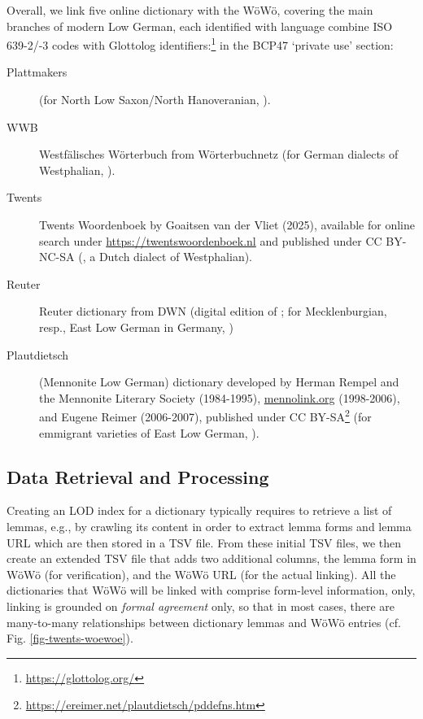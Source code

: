 Overall, we link five online dictionary with the WöWö, covering the main branches of modern Low German, each identified with language combine ISO 639-2/-3 codes with Glottolog identifiers:\footnote{\url{https://glottolog.org/}} in the BCP47 `private use' section: 

\begin{description}
\item[Plattmakers] (for North Low Saxon/North Hanoveranian, ).
\item[WWB] Westfälisches Wörterbuch from Wörterbuchnetz (for German dialects of Westphalian, ).
\item[Twents] Twents Woordenboek by Goaitsen van der Vliet (2025), available for online search under \url{https://twentswoordenboek.nl} and published under CC BY-NC-SA (, a Dutch dialect of Westphalian).
\item[Reuter] Reuter dictionary from DWN (digital edition of \cite{muller1904reuter}; for Mecklenburgian, resp., East Low German in Germany, )
\item[Plautdietsch] (Mennonite Low German) dictionary developed by Herman Rempel and the Mennonite Literary Society (1984-1995), \url{mennolink.org} (1998-2006), and Eugene Reimer (2006-2007), published under CC BY-SA\footnote{\url{https://ereimer.net/plautdietsch/pddefns.htm}} (for emmigrant varieties of East Low German, ). 
\end{description}

\subsection{Data Retrieval and Processing}

Creating an LOD index for a dictionary typically requires to retrieve a list of lemmas, e.g., by crawling its content in order to extract lemma forms and lemma URL which are then stored in a TSV file. 
From these initial TSV files, we then create an extended TSV file that adds two additional columns, the lemma form in WöWö (for verification), and the WöWö URL (for the actual linking). All the dictionaries that WöWö will be linked with comprise form-level information, only, linking is grounded on \emph{formal agreement} only, so that in most cases, there are many-to-many relationships between dictionary lemmas and WöWö entries (cf. Fig. \ref{fig-twents-woewoe}).

